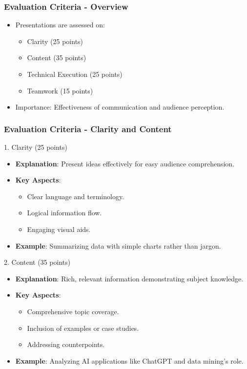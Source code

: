 \documentclass[aspectratio=169]{beamer}
\begin{document}
\begin{frame}[fragile]
    \frametitle{Evaluation Criteria - Overview}
    \begin{itemize}
        \item Presentations are assessed on:
        \begin{itemize}
            \item Clarity (25 points)
            \item Content (35 points)
            \item Technical Execution (25 points)
            \item Teamwork (15 points)
        \end{itemize}
        \item Importance: Effectiveness of communication and audience perception.
    \end{itemize}
\end{frame}

\begin{frame}[fragile]
    \frametitle{Evaluation Criteria - Clarity and Content}
    \begin{block}{1. Clarity (25 points)}
        \begin{itemize}
            \item \textbf{Explanation}: Present ideas effectively for easy audience comprehension.
            \item \textbf{Key Aspects}:
            \begin{itemize}
                \item Clear language and terminology.
                \item Logical information flow.
                \item Engaging visual aids.
            \end{itemize}
            \item \textbf{Example}: Summarizing data with simple charts rather than jargon.
        \end{itemize}
    \end{block}
    
    \begin{block}{2. Content (35 points)}
        \begin{itemize}
            \item \textbf{Explanation}: Rich, relevant information demonstrating subject knowledge.
            \item \textbf{Key Aspects}:
            \begin{itemize}
                \item Comprehensive topic coverage.
                \item Inclusion of examples or case studies.
                \item Addressing counterpoints.
            \end{itemize}
            \item \textbf{Example}: Analyzing AI applications like ChatGPT and data mining's role.
        \end{itemize}
    \end{block}
\end{frame}
\end{document}
